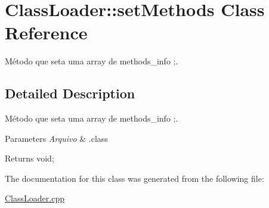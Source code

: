 \hypertarget{class_class_loader_1_1set_methods}{}\section{Class\+Loader\+:\+:set\+Methods Class Reference}
\label{class_class_loader_1_1set_methods}


Método que seta uma array de methods\+\_\+info ;.  




\subsection{Detailed Description}
Método que seta uma array de methods\+\_\+info ;. 


\begin{DoxyParams}{Parameters}
{\em Arquivo} & .class \\
\hline
\end{DoxyParams}
\begin{DoxyReturn}{Returns}
void; 
\end{DoxyReturn}


The documentation for this class was generated from the following file\+:\begin{DoxyCompactItemize}
\item 
\hyperlink{_class_loader_8cpp}{Class\+Loader.\+cpp}\end{DoxyCompactItemize}
